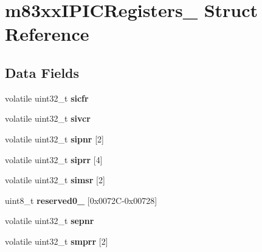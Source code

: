 \hypertarget{structm83xxIPICRegisters__}{}\section{m83xx\+I\+P\+I\+C\+Registers\+\_\+ Struct Reference}
\label{structm83xxIPICRegisters__}
\subsection*{Data Fields}
\begin{DoxyCompactItemize}
\item 
\mbox{\label{structm83xxIPICRegisters___a808f0cb21318bb27e6a47be64ad5ecb0}} 
volatile uint32\+\_\+t {\bfseries sicfr}
\item 
\mbox{\label{structm83xxIPICRegisters___a2abf7223de376e27df7e8ef1ba4f1677}} 
volatile uint32\+\_\+t {\bfseries sivcr}
\item 
\mbox{\label{structm83xxIPICRegisters___a598fb82ab0335ca06cbd4c4b30fe5a72}} 
volatile uint32\+\_\+t {\bfseries sipnr} \mbox{[}2\mbox{]}
\item 
\mbox{\label{structm83xxIPICRegisters___aaed8197b3ab45f7f7f0bec6f6bb77fcb}} 
volatile uint32\+\_\+t {\bfseries siprr} \mbox{[}4\mbox{]}
\item 
\mbox{\label{structm83xxIPICRegisters___af43130768cabc8ba06429c497dc110e0}} 
volatile uint32\+\_\+t {\bfseries simsr} \mbox{[}2\mbox{]}
\item 
\mbox{\label{structm83xxIPICRegisters___a45f181dd8d78691931575858a0ad7bc2}} 
uint8\+\_\+t {\bfseries reserved0\+\_} \mbox{[}0x0072\+C-\/0x00728\mbox{]}
\item 
\mbox{\label{structm83xxIPICRegisters___aa29790543299fa5e76cf2484d14e5936}} 
volatile uint32\+\_\+t {\bfseries sepnr}
\item 
\mbox{\label{structm83xxIPICRegisters___a362d8445cc743b3d3c15e8eb7306e6aa}} 
volatile uint32\+\_\+t {\bfseries smprr} \mbox{[}2\mbox{]}

\end{DoxyCompactItemize}
